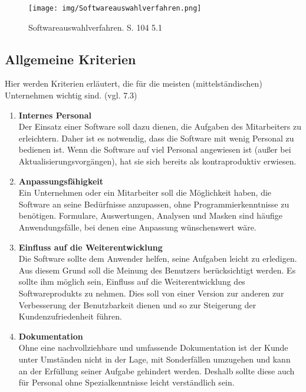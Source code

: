 \documentclass[11pt]{scrartcl}       %
\begin{document}
\begin{figure}[!htb]
	\centering
	\texttt{[image: img/Softwareauswahlverfahren.png]}
	\caption{Softwareauswahlverfahren. \cite{teich2008richtige} S. 104 5.1}
\label{fig:qms_principles}
\end{figure}

\subsection{Allgemeine Kriterien}
Hier werden Kriterien erläutert, die für die meisten (mittelständischen) Unternehmen wichtig sind. (vgl. \cite{gross2017professionelle} 7.3) 
\begin{enumerate}

\item[] \textbf{Internes Personal} \\
Der Einsatz einer Software soll dazu dienen, die Aufgaben des Mitarbeiters zu erleichtern. Daher ist es notwendig, dass die Software mit wenig Personal zu bedienen ist. Wenn die Software auf viel Personal angewiesen ist (außer bei Aktualisierungsvorgängen), hat sie sich bereits als kontraproduktiv erwiesen.

\item[] \textbf{Anpassungsfähigkeit} \\
Ein Unternehmen oder ein Mitarbeiter soll die Möglichkeit haben, die Software an seine Bedürfnisse anzupassen, ohne Programmierkenntnisse zu benötigen. Formulare, Auswertungen, Analysen und Masken sind häufige Anwendungsfälle, bei denen eine Anpassung wünschenswert wäre. 

\item[] \textbf{Einfluss auf die Weiterentwicklung} \\
Die Software sollte dem Anwender helfen, seine Aufgaben leicht zu erledigen. Aus diesem Grund soll die Meinung des Benutzers berücksichtigt werden. Es sollte ihm möglich sein, Einfluss auf die Weiterentwicklung des Softwareprodukts zu nehmen. Dies soll von einer Version zur anderen zur Verbesserung der Benutzbarkeit dienen und so zur Steigerung der Kundenzufriedenheit führen.

\item[] \textbf{Dokumentation} \\
Ohne eine nachvollziehbare und umfassende Dokumentation ist der Kunde unter Umständen nicht in der Lage, mit Sonderfällen umzugehen und kann an der Erfüllung seiner Aufgabe gehindert werden. Deshalb sollte diese auch für Personal ohne Spezialkenntnisse leicht verständlich sein.


\end{enumerate}
\end{document}
